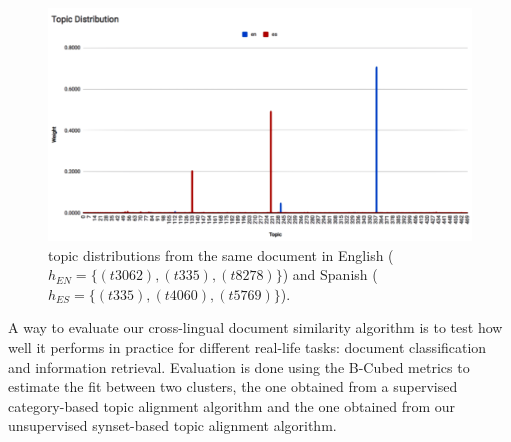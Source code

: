 \begin{figure}[ht]\centering
\includegraphics[scale=0.4]{topic-dist.png}
\caption{topic distributions from the same document in English ($h_{EN}=\{(t3062),(t335),(t8278)\}$) and Spanish ($h_{ES}=\{(t335),(t4060),(t5769)\}$).}
\label{fig:topic_distributions}
\end{figure}


A way to evaluate our cross-lingual document similarity algorithm is to test how well it performs in practice for different real-life tasks: document classification and information retrieval. Evaluation is done using the B-Cubed metrics \citep{Bagga1998} to estimate the fit between two clusters, the one obtained from a supervised category-based topic alignment algorithm and the one obtained from our unsupervised synset-based topic alignment algorithm. 

